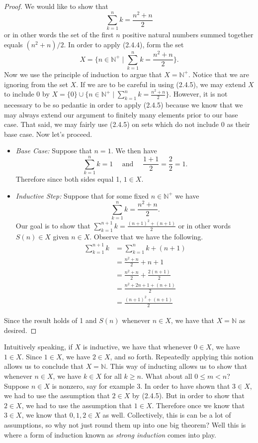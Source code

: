 \documentclass[12pt]{book}
\def\N{{\mathbb{N}}}
\begin{document}
\begin{proof}
We would like to show that 
\[\sum_{k=1}^n k=\frac{n^2+n}{2}\]
or in other words the set of the first $n$ positive natural numbers summed together equals $(n^2+n)/2$. In order to apply (2.4.4), form the set 
\[X=\{n\in\N^+\mid \sum_{k=1}^n k=\frac{n^2+n}{2}\}.\]
Now we use the principle of induction to argue that $X=\N^+$. Notice that we are ignoring from the set $X$. If we are to be careful in using (2.4.5), we may extend $X$ to include $0$ by $X=\{0\}\cup\{n\in\N^+\mid \sum_{k=1}^n k=\frac{n^2+n}{2}\}$. However, it is not necessary to be so pedantic in order to apply (2.4.5) because we know that we may always extend our argument to finitely many elements prior to our base case. That said, we may fairly use (2.4.5) on sets which do not include 0 as their base case. Now let's proceed.
\begin{itemize}
\item \textit{Base Case:} Suppose that $n=1$. We then have
\[\sum_{k=1}^n k=1\quad\text{ and }\quad \frac{1+1}{2}=\frac{2}{2}=1.\]
Therefore since both sides equal 1, $1\in X$.
\item \textit{Inductive Step:} Suppose that for some fixed $n\in\N^+$ we have 
\[\sum_{k=1}^n k=\frac{n^2+n}{2}.\]
Our goal is to show that $\displaystyle\sum_{k=1}^{n+1} k=\frac{(n+1)^2+(n+1)}{2}$ or in other words $S(n)\in X$ given $n\in X$. Observe that we have the following.
\begin{align*}
\sum_{k=1}^{n+1} k & = \sum_{k=1}^n k+(n+1)\\
 & = \frac{n^2+n}{2} + n+1\\
 & = \frac{n^2+n}{2} + \frac{2(n+1)}{2}\\
 & = \frac{n^2+2n+1+(n+1)}{2}\\
 & = \frac{(n+1)^2+(n+1)}{2}
\end{align*}
\end{itemize}
Since the result holds of 1 and $S(n)$ whenever $n\in X$, we have that $X=\N$ as desired.
\end{proof}

Intuitively speaking, if $X$ is inductive, we have that whenever $0\in X$, we have $1\in X$. Since $1\in X$, we have $2\in X$, and so forth. Repeatedly applying this notion allows us to conclude that $X=\N$. This way of inducting allows us to show that whenever $n\in X$, we have $k\in X$ for all $k\geq n$. What about all $0\leq m<n$? Suppose $n\in X$ is nonzero, say for example 3. In order to have shown that $3\in X$, we had to use the assumption that $2\in X$ by (2.4.5). But in order to show that $2\in X$, we had to use the assumption that $1\in X$. Therefore once we know that $3\in X$, we know that $0,1,2\in X$ as well. Collectively, this is can be a lot of assumptions, so why not just round them up into one big theorem? Well this is where a form of induction known as \textit{strong induction} comes into play.\\
\end{document}
